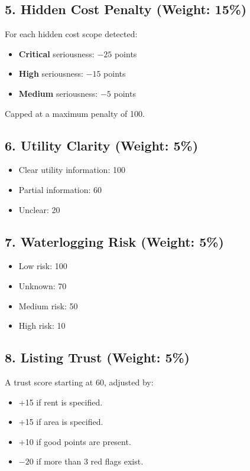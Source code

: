 \documentclass[12pt, a4paper, oneside]{report}
\begin{document}
\subsection{5. Hidden Cost Penalty (Weight: 15\%)}

For each hidden cost scope detected:
\begin{itemize}[leftmargin=2em]
  \item \textbf{Critical} seriousness: $-25$ points
  \item \textbf{High} seriousness: $-15$ points
  \item \textbf{Medium} seriousness: $-5$ points
\end{itemize}
Capped at a maximum penalty of 100.

\subsection{6. Utility Clarity (Weight: 5\%)}

\begin{itemize}[leftmargin=2em]
  \item Clear utility information: 100
  \item Partial information: 60
  \item Unclear: 20
\end{itemize}

\subsection{7. Waterlogging Risk (Weight: 5\%)}

\begin{itemize}[leftmargin=2em]
  \item Low risk: 100
  \item Unknown: 70
  \item Medium risk: 50
  \item High risk: 10
\end{itemize}

\subsection{8. Listing Trust (Weight: 5\%)}

A trust score starting at 60, adjusted by:
\begin{itemize}[leftmargin=2em]
  \item +15 if rent is specified.
  \item +15 if area is specified.
  \item +10 if good points are present.
  \item $-20$ if more than 3 red flags exist.
\end{itemize}
\end{document}
